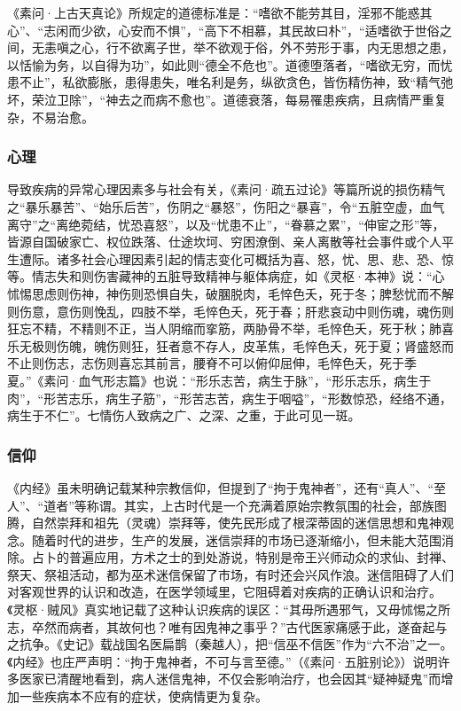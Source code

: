 \documentclass[12pt]{ctexbook}
\begin{document}
《素问·上古天真论》所规定的道德标准是：“嗜欲不能劳其目，淫邪不能惑其心”、“志闲而少欲，心安而不惧”，“高下不相慕，其民故曰朴”，“适嗜欲于世俗之间，无恚嗔之心，行不欲离子世，举不欲观于俗，外不劳形于事，内无思想之患，以恬愉为务，以自得为功”，如此则“德全不危也”。道德堕落者，“嗜欲无穷，而忧患不止”，私欲膨胀，患得患失，唯名利是务，纵欲贪色，皆伤精伤神，致“精气弛坏，荣泣卫除”，“神去之而病不愈也”。道德衰落，每易罹患疾病，且病情严重复杂，不易治愈。

\subsubsection{心理}%

导致疾病的异常心理因素多与社会有关，《素问·疏五过论》等篇所说的损伤精气之“暴乐暴苦”、“始乐后苦”，伤阴之“暴怒”，伤阳之“暴喜”，令“五脏空虚，血气离守”之“离绝菀结，忧恐喜怒”，以及“忧患不止”，“眷慕之累”，“伸宦之形”等，皆源自国破家亡、权位跌落、仕途坎坷、穷困潦倒、亲人离散等社会事件或个人平生遭际。诸多社会心理因素引起的情志变化可概括为喜、怒，忧、思、悲、恐、惊等。情志失和则伤害藏神的五脏导致精神与躯体病症，如《灵枢·本神》说：“心怵惕思虑则伤神，神伤则恐惧自失，破䐃脱肉，毛悴色夭，死于冬；脾愁忧而不解则伤意，意伤则悗乱，四肢不举，毛悴色夭，死于春；肝悲哀动中则伤魂，魂伤则狂忘不精，不精则不正，当人阴缩而挛筋，两胁骨不举，毛悴色夭，死于秋；肺喜乐无极则伤魄，魄伤则狂，狂者意不存人，皮革焦，毛悴色夭，死于夏；肾盛怒而不止则伤志，志伤则喜忘其前言，腰脊不可以俯仰屈伸，毛悴色夭，死于季夏。”《素问·血气形志篇》也说：“形乐志苦，病生于脉”，“形乐志乐，病生于肉”，“形苦志乐，病生子筋”，“形苦志苦，病生于咽嗌”，“形数惊恐，经络不通，病生于不仁”。七情伤人致病之广、之深、之重，于此可见一斑。

\subsubsection{信仰}%

《内经》虽未明确记载某种宗教信仰，但提到了“拘于鬼神者”，还有“真人”、“至人”、“道者”等称谓。其实，上古时代是一个充满着原始宗教氛围的社会，部族图腾，自然崇拜和祖先（灵魂）崇拜等，使先民形成了根深蒂固的迷信思想和鬼神观念。随着时代的进步，生产的发展，迷信崇拜的市场已逐渐缩小，但未能大范围消除。占卜的普遍应用，方术之士的到处游说，特别是帝王兴师动众的求仙、封禅、祭天、祭祖活动，都为巫术迷信保留了市场，有时还会兴风作浪。迷信阻碍了人们对客观世界的认识和改造，在医学领域里，它阻碍着对疾病的正确认识和治疗。《灵枢·贼风》真实地记载了这种认识疾病的误区：“其毋所遇邪气，又毋怵惕之所志，卒然而病者，其故何也？唯有因鬼神之事乎？”古代医家痛感于此，遂奋起与之抗争。《史记》载战国名医扁鹊（秦越人），把“信巫不信医”作为“六不治”之一。《内经》也庄严声明：“拘于鬼神者，不可与言至德。”（《素问·五脏别论》）说明许多医家已清醒地看到，病人迷信鬼神，不仅会影响治疗，也会因其“疑神疑鬼”而增加一些疾病本不应有的症状，使病情更为复杂。
\end{document}
